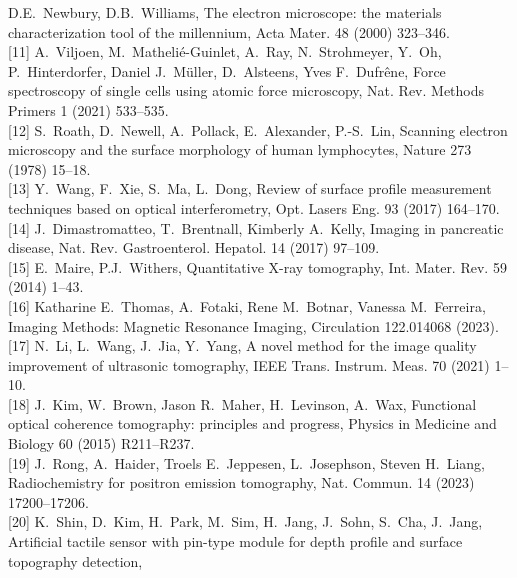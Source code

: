 \documentclass[11pt]{article}
\begin{document}
\begin{footnotesize}
[10] D.E.~Newbury, D.B.~Williams, The electron microscope: the
materials characterization tool of the millennium, Acta Mater. 48
(2000) 323--346.\\[2pt]
[11] A.~Viljoen, M.~Mathelié-Guinlet, A.~Ray, N.~Strohmeyer,
Y.~Oh, P.~Hinterdorfer, Daniel J.~Müller, D.~Alsteens, Yves F.~Dufrêne,
Force spectroscopy of single cells using atomic force microscopy,
Nat. Rev. Methods Primers 1 (2021) 533--535.\\[2pt]
[12] S.~Roath, D.~Newell, A.~Pollack, E.~Alexander, P.-S.~Lin,
Scanning electron microscopy and the surface morphology of human
lymphocytes, Nature 273 (1978) 15--18.\\[2pt]
[13] Y.~Wang, F.~Xie, S.~Ma, L.~Dong, Review of surface profile
measurement techniques based on optical interferometry, Opt. Lasers
Eng. 93 (2017) 164--170.\\[2pt]
[14] J.~Dimastromatteo, T.~Brentnall, Kimberly A.~Kelly, Imaging in
pancreatic disease, Nat. Rev. Gastroenterol. Hepatol. 14 (2017)
97--109.\\[2pt]
[15] E.~Maire, P.J.~Withers, Quantitative X-ray tomography, Int.
Mater. Rev. 59 (2014) 1--43.\\[2pt]
[16] Katharine E.~Thomas, A.~Fotaki, Rene M.~Botnar, Vanessa M.~Ferreira,
Imaging Methods: Magnetic Resonance Imaging, Circulation 122.014068
(2023).\\[2pt]
[17] N.~Li, L.~Wang, J.~Jia, Y.~Yang, A novel method for the image
quality improvement of ultrasonic tomography, IEEE Trans. Instrum.
Meas. 70 (2021) 1--10.\\[2pt]
[18] J.~Kim, W.~Brown, Jason R.~Maher, H.~Levinson, A.~Wax,
Functional optical coherence tomography: principles and progress,
Physics in Medicine and Biology 60 (2015) R211--R237.\\[2pt]
[19] J.~Rong, A.~Haider, Troels E.~Jeppesen, L.~Josephson,
Steven H.~Liang, Radiochemistry for positron emission tomography,
Nat. Commun. 14 (2023) 17200--17206.\\[2pt]
[20] K.~Shin, D.~Kim, H.~Park, M.~Sim, H.~Jang, J.~Sohn, S.~Cha,
J.~Jang, Artificial tactile sensor with pin-type module for depth
profile and surface topography detection,
\end{footnotesize}
\end{document}
